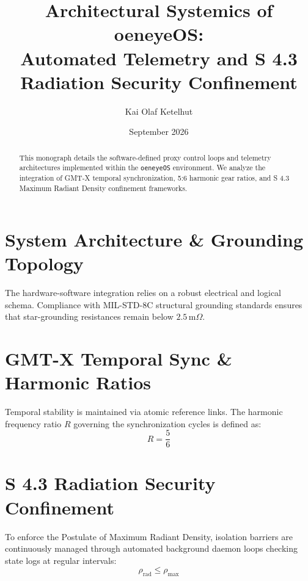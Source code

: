 \documentclass[11pt,a4paper]{article}
\title{\textbf{Architectural Systemics of oeneyeOS:} \\ Automated Telemetry and S 4.3 Radiation Security Confinement}
\author{Kai Olaf Ketelhut}
\date{September 2026}
\begin{document}
\maketitle

\begin{abstract}
This monograph details the software-defined proxy control loops and telemetry architectures implemented within the \texttt{oeneyeOS} environment. We analyze the integration of GMT-X temporal synchronization, 5:6 harmonic gear ratios, and S 4.3 Maximum Radiant Density confinement frameworks.
\end{abstract}

\section{System Architecture \& Grounding Topology}
The hardware-software integration relies on a robust electrical and logical schema. Compliance with MIL-STD-8C structural grounding standards ensures that star-grounding resistances remain below $2.5\,\text{m}\Omega$.

\section{GMT-X Temporal Sync \& Harmonic Ratios}
Temporal stability is maintained via atomic reference links. The harmonic frequency ratio $R$ governing the synchronization cycles is defined as:
$$R = \frac{5}{6}$$

\section{S 4.3 Radiation Security Confinement}
To enforce the Postulate of Maximum Radiant Density, isolation barriers are continuously managed through automated background daemon loops checking state logs at regular intervals:
$$\rho_{\text{rad}} \le \rho_{\max}$$
\end{document}
